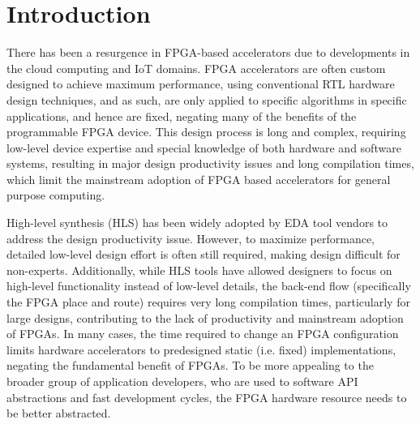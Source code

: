 \section{Introduction}
\label{ch1_introduction}

There has been a resurgence in FPGA-based accelerators due to developments in the cloud computing and IoT domains. 
FPGA accelerators are often custom designed to achieve maximum performance, using conventional RTL hardware design techniques, and as such, are only applied to specific algorithms in specific applications, and hence are fixed, negating many of the benefits of the programmable FPGA device. This design process is long and complex, requiring low-level device expertise and special knowledge of both hardware and software systems, resulting in major design productivity issues and long compilation times, which limit the mainstream adoption of FPGA based accelerators for general purpose computing. 

High-level synthesis (HLS) has been widely adopted by EDA tool vendors to address the design productivity issue. However, to maximize performance, detailed low-level design effort is often still required, making design difficult for non-experts. Additionally, while HLS tools have allowed designers to focus on high-level functionality instead of low-level details, the back-end flow (specifically the FPGA place and route) requires very long compilation times, particularly for large designs, contributing to the lack of productivity and mainstream adoption of FPGAs. In many cases, the time required to change an FPGA configuration limits hardware accelerators to predesigned static (i.e. fixed) implementations, negating the fundamental benefit of FPGAs. To be more appealing to the broader group of application developers, who are used to software API abstractions and fast development cycles, the FPGA hardware resource needs to be better abstracted.

